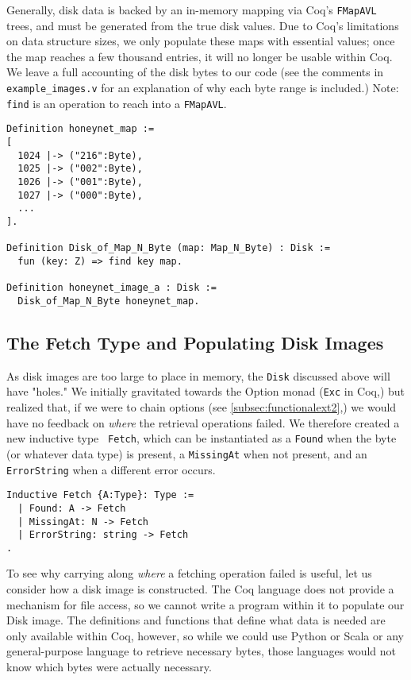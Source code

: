 \documentclass[nocopyrightspace]{sigplanconf}
\begin{document}
Generally, disk data is backed by an in-memory mapping via Coq's {\tt FMapAVL}
trees, and must be generated from the true disk values. Due to Coq's
limitations on data structure sizes, we only populate these maps with
essential values; once the map reaches a few thousand entries, it will no
longer be usable within Coq. We leave a full accounting of the disk bytes to
our code (see the comments in {\tt example\_images.v} for an explanation of
why each byte range is included.) Note: {\tt find} is an operation to reach
into a {\tt FMapAVL}.

\begin{lstlisting}
Definition honeynet_map := 
[ 
  1024 |-> ("216":Byte), 
  1025 |-> ("002":Byte),
  1026 |-> ("001":Byte), 
  1027 |-> ("000":Byte), 
  ...
].

Definition Disk_of_Map_N_Byte (map: Map_N_Byte) : Disk :=
  fun (key: Z) => find key map.

Definition honeynet_image_a : Disk := 
  Disk_of_Map_N_Byte honeynet_map.
\end{lstlisting}

\subsection{The Fetch Type and Populating Disk Images}
\label{subsec:fetch}

As disk images are too large to place in memory, the {\tt Disk} discussed
above will have "holes." We initially gravitated towards the Option monad
({\tt Exc} in Coq,) but realized that, if we were to chain options (see
\ref{subsec:functionalext2},) we would have no feedback on {\em where} the
retrieval operations failed. We therefore created a new inductive type {\tt
Fetch}, which can be instantiated as a {\tt Found} when the byte (or whatever
data type) is present, a {\tt MissingAt} when not present, and an {\tt
ErrorString} when a different error occurs.

\begin{lstlisting}
Inductive Fetch {A:Type}: Type :=
  | Found: A -> Fetch
  | MissingAt: N -> Fetch
  | ErrorString: string -> Fetch
.
\end{lstlisting}

To see why carrying along {\em where} a fetching operation failed is useful,
let us consider how a disk image is constructed. The Coq language does not
provide a mechanism for file access, so we cannot write a program within it to
populate our Disk image. The definitions and functions that define what data
is needed are only available within Coq, however, so while we could use Python
or Scala or any general-purpose language to retrieve necessary bytes, those
languages would not know which bytes were actually necessary.
\end{document}
